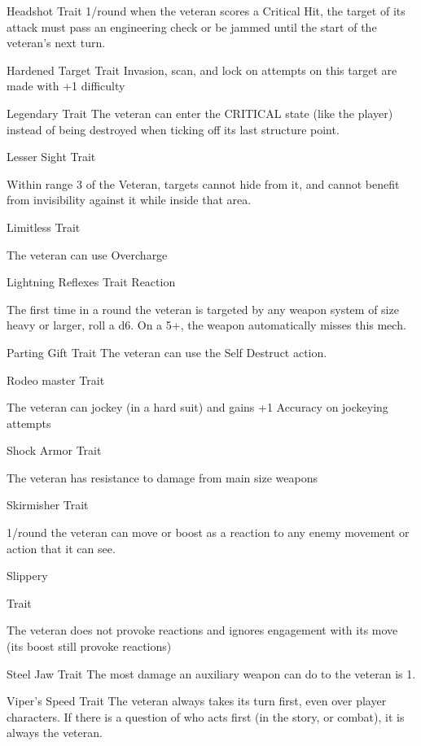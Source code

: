 Headshot
Trait
1/round when the veteran scores a Critical Hit, the target of its attack must pass an engineering
check or be jammed until the start of the veteran’s next turn.


Hardened Target
Trait
Invasion, scan, and lock on attempts on this target are made with +1 difficulty


Legendary
Trait
The veteran can enter the CRITICAL state (like the player) instead of being destroyed when
ticking off its last structure point.


Lesser Sight
Trait

Within range 3 of the Veteran, targets cannot hide from it, and cannot benefit from invisibility
against it while inside that area.


Limitless
Trait

The veteran can use Overcharge


Lightning Reflexes
Trait
Reaction

The first time in a round the veteran is targeted by any weapon system of size heavy or larger, roll
a d6. On a 5+, the weapon automatically misses this mech.


Parting Gift
Trait
The veteran can use the Self Destruct action.


Rodeo master
Trait




The veteran can jockey (in a hard suit) and gains +1 Accuracy on jockeying attempts


Shock Armor
Trait

The veteran has resistance to damage from main size weapons


Skirmisher
Trait

1/round the veteran can move or boost as a reaction to any enemy movement or action that it
can see.


Slippery

Trait

The veteran does not provoke reactions and ignores engagement with its move (its boost still
provoke reactions)


Steel Jaw
Trait
The most damage an auxiliary weapon can do to the veteran is 1.


Viper’s Speed
Trait
The veteran always takes its turn first, even over player characters. If there is a question of who
acts first (in the story, or combat), it is always the veteran.
